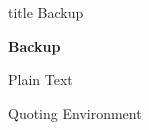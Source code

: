 \documentclass[aspectratio=1610]{beamer}
\begin{document}
\begin{NCARprettyframe}
  \begin{beamercolorbox}[sep=8pt,center]{title}
    \Huge{Backup}
  \end{beamercolorbox}
    \begin{exampleblock}{}
      \centering
      \textbf{Backup}
  \end{exampleblock}{}

\end{NCARprettyframe}



\begin{frame}{Plain Text}
  \lipsum[1]
\end{frame}



\begin{frame}{Quoting Environment}
  \lipsum[3]
  \begin{quote}
    \lipsum[4]
  \end{quote}
\end{frame}



\begin{frame}
  \vspace{3em}
  \hspace{1em}\layout{}
\end{frame}
\end{document}
